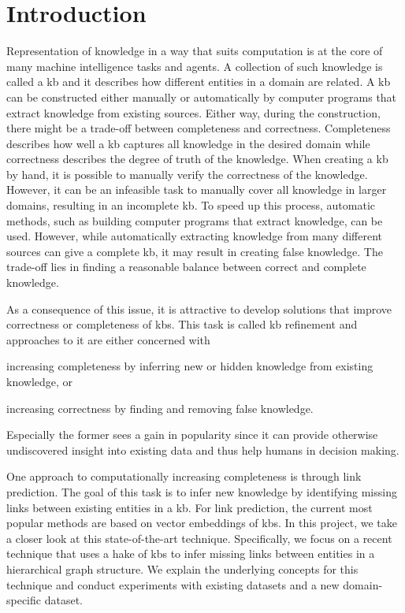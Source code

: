 \section{Introduction}\label{sec:introduction}

Representation of knowledge in a way that suits computation is at the core of many machine intelligence tasks and agents.
A collection of such knowledge is called a \ac{kb} and it describes how different entities in a domain are related.
A \ac{kb} can be constructed either manually or automatically by computer programs that extract knowledge from existing sources.
Either way, during the construction, there might be a trade-off between completeness and correctness\cite{Paulheim2016}.
Completeness describes how well a \ac{kb} captures all knowledge in the desired domain while correctness describes the degree of truth of the knowledge.
When creating a \ac{kb} by hand, it is possible to manually verify the correctness of the knowledge.
However, it can be an infeasible task to manually cover all knowledge in larger domains, resulting in an incomplete \ac{kb}.
To speed up this process, automatic methods, such as building computer programs that extract knowledge, can be used.
However, while automatically extracting knowledge from many different sources can give a complete \ac{kb}, it may result in creating false knowledge.
The trade-off lies in finding a reasonable balance between correct and complete knowledge.

As a consequence of this issue, it is attractive to develop solutions that improve correctness or completeness of \acp{kb}.
This task is called \ac{kb} refinement and approaches to it are either concerned with
\begin{enumerate*}
  \item increasing completeness by inferring new or hidden knowledge from existing knowledge, or
  \item increasing correctness by finding and removing false knowledge.
\end{enumerate*}
Especially the former sees a gain in popularity since it can provide otherwise undiscovered insight into existing data and thus help humans in decision making.

One approach to computationally increasing completeness is through link prediction.
The goal of this task is to infer new knowledge by identifying missing links between existing entities in a \ac{kb}.
For link prediction, the current most popular methods are based on vector embeddings of \acp{kb}.
In this project, we take a closer look at this state-of-the-art technique.
Specifically, we focus on a recent technique that uses a \ac{hake} of \acp{kb} to infer missing links between entities in a hierarchical graph structure\cite{Zhang2019}.
We explain the underlying concepts for this technique and conduct experiments with existing datasets and a new domain-specific dataset.

